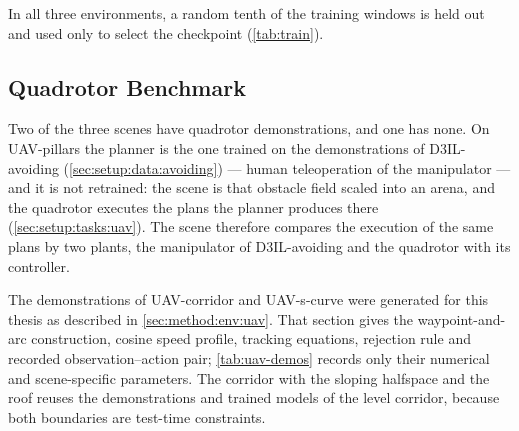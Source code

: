 In all three environments, a random tenth of the training windows is held out and used only to select
the checkpoint (\autoref{tab:train}).

\subsection{Quadrotor Benchmark}\label{sec:setup:data:uav}

Two of the three scenes have quadrotor demonstrations, and one has none. On UAV-pillars the planner is
the one trained on the demonstrations of D3IL-avoiding (\autoref{sec:setup:data:avoiding}) --- human
teleoperation of the manipulator --- and it is not retrained: the scene is that
obstacle field scaled into an arena, and the quadrotor executes the plans the planner produces there
(\autoref{sec:setup:tasks:uav}). The scene therefore compares the execution of the same plans by two
plants, the manipulator of D3IL-avoiding and the quadrotor with its controller.

The demonstrations of UAV-corridor and UAV-s-curve were generated for this thesis as described in
\autoref{sec:method:env:uav}. That section gives the waypoint-and-arc construction, cosine speed profile,
tracking equations, rejection rule and recorded observation--action pair; \autoref{tab:uav-demos} records
only their numerical and scene-specific parameters. The corridor with the sloping halfspace and the roof
reuses the demonstrations and trained models of the level corridor, because both boundaries are test-time
constraints.

